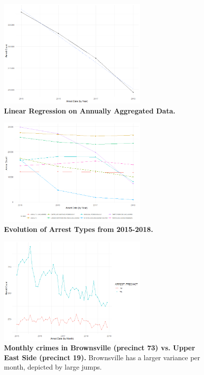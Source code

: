 \documentclass[11pt]{article}\usepackage[]{graphicx}\usepackage[]{color}
\begin{document}
\begin{figure}[H]
  \centering
    \includegraphics[width=0.65\textwidth]{Yearlytrend.png}
  \caption{\textbf{Linear Regression on Annually Aggregated Data.}}
  \label{fig:Yearlytrend}
\end{figure}

\begin{figure}[H]
  \centering
    \includegraphics[width=0.65\textwidth]{crimeOverYears.png}
  \caption{\textbf{Evolution of Arrest Types from 2015-2018.}}
  \label{fig:crimeOverYears}
\end{figure}

\begin{figure}[H]
  \centering
    \includegraphics[width=0.65\textwidth]{BrownUES.png}
  \caption{\textbf{Monthly crimes in Brownsville (precinct 73) vs. Upper East Side (precinct 19).} Brownsville has a larger variance per month, depicted by large jumps.}
  \label{fig:BrownUES}
\end{figure}
\end{document}
